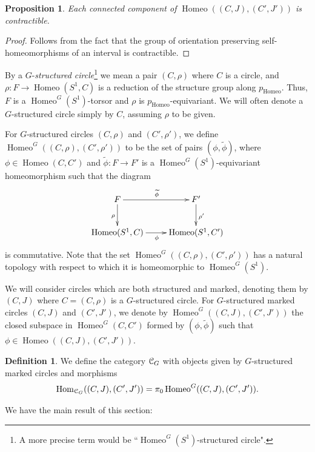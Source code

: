 \documentclass[english,11pt,leqno]{article}
\def\Hom{\operatorname{Hom}}
\def\on{\operatorname}
\def\Hom{\operatorname{Hom}}
\def\CG{{ {\EuScript C}_G}}
\def\Homeo{{ \on{Homeo}}}
\newtheorem{prop}[thm]{Proposition}
\theoremstyle{definition}
\newtheorem{defi}[thm]{Definition}
\theoremstyle{remark}
\numberwithin{equation}{section}
\begin{document}
\begin{prop}\label{prop:homeo-contr}
Each connected component of $\Homeo((C,J), (C',J'))$ is contractible. 
\end{prop}

\begin{proof} Follows from the fact that the group of orientation preserving self-homeomorphisms
of an interval is contractible.
\end{proof}

By a $G$-{\em structured circle}\footnote{A more precise term would be ``$\Homeo^G(S^1)$-structured circle".}
we mean a pair $(C,\rho)$ where $C$ is a circle, and $\rho: F\to\Homeo(S^1, C)$ is a reduction of the structure
group along $p_\Homeo$. Thus, $F$ is a $\Homeo^G(S^1)$-torsor and $\rho$ is $p_\Homeo$-equivariant.
We will often denote a $G$-structured circle simply by $C$, assuming $\rho$ to be given. 

For $G$-structured circles $(C,\rho)$ and $(C',\rho')$, we define $\Homeo^G((C,\rho), (C',\rho'))$
to be the set of pairs $(\phi, \widetilde\phi)$, where $\phi\in\Homeo(C,C')$ and $\widetilde\phi: F\to F'$
is a $\Homeo^G(S^1)$-equivariant homeomorphism such that the diagram
\[
\xymatrix{
F\ar[d]_\rho
\ar[r]^{\widetilde\phi}& F'\ar[d]^{\rho'}
\\
\Homeo(S^1, C) \ar[r]_\phi & \Homeo(S^1, C')
}
\]
is commutative. Note that the set $\Homeo^G((C,\rho), (C',\rho'))$ has a natural topology with respect to which it is
homeomorphic to $\Homeo^G(S^1)$. 

We will consider circles which are both structured and marked, denoting them by $(C,J)$ where
$C=(C,\rho)$ is a $G$-structured circle. For $G$-structured marked circles $(C, J)$ and
$(C',J')$, we denote by $\Homeo^G((C,J), (C',J '))$ the closed subspace in $\Homeo^G(C,C')$ formed by
$(\phi,\widetilde\phi)$ such that $\phi\in \Homeo((C,J), (C',J '))$. 
 
\begin{defi}
We define the category $\CG$ with objects given by $G$-structured marked circles and morphisms 
\[
\Hom_{\CG}((C,J), (C',J')) = \pi_0\, \Homeo^G((C,J), (C',J ')). 
\]
\end{defi}

We have the main result of this section: 
 
\end{document}
